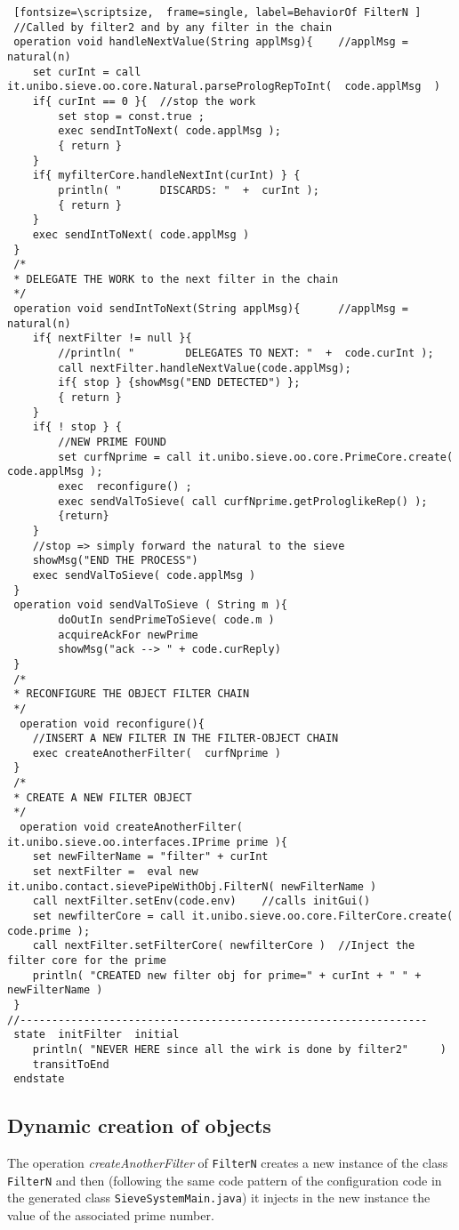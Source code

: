\documentclass{../llncs}
\begin{document}
\begin{Verbatim} [fontsize=\scriptsize,  frame=single, label=BehaviorOf FilterN ]
 //Called by filter2 and by any filter in the chain   
 operation void handleNextValue(String applMsg){ 	//applMsg = natural(n)
	set curInt = call it.unibo.sieve.oo.core.Natural.parsePrologRepToInt(  code.applMsg  )
	if{ curInt == 0 }{	//stop the work
		set stop = const.true ;
		exec sendIntToNext( code.applMsg );
		{ return }
	}
	if{ myfilterCore.handleNextInt(curInt) } { 
		println( "		DISCARDS: "  +  curInt );
		{ return }
	}
	exec sendIntToNext( code.applMsg )
 }    
 /*
 * DELEGATE THE WORK to the next filter in the chain
 */
 operation void sendIntToNext(String applMsg){		//applMsg = natural(n)	
	if{ nextFilter != null }{ 
		//println( "		DELEGATES TO NEXT: "  +  code.curInt );			
		call nextFilter.handleNextValue(code.applMsg);
		if{ stop } {showMsg("END DETECTED") };
		{ return }
	}   
	if{ ! stop } {
		//NEW PRIME FOUND  
		set curfNprime = call it.unibo.sieve.oo.core.PrimeCore.create( code.applMsg );
		exec  reconfigure() ;
		exec sendValToSieve( call curfNprime.getProloglikeRep() );
		{return}
	}	 
	//stop => simply forward the natural to the sieve
	showMsg("END THE PROCESS")
	exec sendValToSieve( code.applMsg )
 }     
 operation void sendValToSieve ( String m ){
    	doOutIn sendPrimeToSieve( code.m )
    	acquireAckFor newPrime
    	showMsg("ack --> " + code.curReply)
 }
 /*
 * RECONFIGURE THE OBJECT FILTER CHAIN
 */
  operation void reconfigure(){
	//INSERT A NEW FILTER IN THE FILTER-OBJECT CHAIN  
	exec createAnotherFilter(  curfNprime ) 		
 }
 /*
 * CREATE A NEW FILTER OBJECT
 */
  operation void createAnotherFilter( it.unibo.sieve.oo.interfaces.IPrime prime ){
	set newFilterName = "filter" + curInt
	set nextFilter =  eval new it.unibo.contact.sievePipeWithObj.FilterN( newFilterName ) 
	call nextFilter.setEnv(code.env)	//calls initGui()  		
	set newfilterCore = call it.unibo.sieve.oo.core.FilterCore.create( code.prime );
	call nextFilter.setFilterCore( newfilterCore )  //Inject the filter core for the prime		
	println( "CREATED new filter obj for prime=" + curInt + " " + newFilterName )
 }   
//----------------------------------------------------------------     
 state  initFilter  initial
	println( "NEVER HERE since all the wirk is done by filter2"  	)
	transitToEnd
 endstate 
\end{Verbatim}


\subsection{Dynamic creation of objects}
The operation \textit{createAnotherFilter} of  \texttt{FilterN} creates a new instance of the class \texttt{FilterN} and then (following the same code pattern of the configuration code in the generated class \texttt{SieveSystemMain.java}) it injects in the new instance  the value of the associated prime number. 
\end{document}
